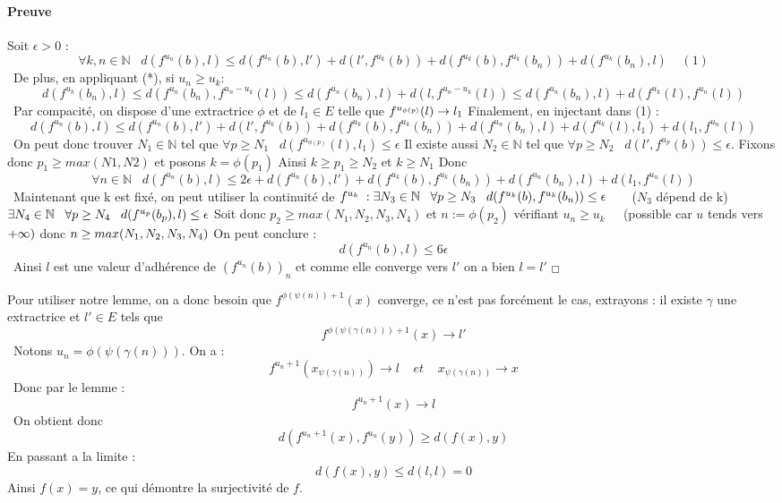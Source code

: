 \documentclass[letterpaper,10pt]{article}
\begin{document}
{\paragraph{Preuve}
Soit $\epsilon > 0$ : \[\ 
   \forall k,n\in \mathbb{N} \;\;\; d(f^{u_n}(b),l) \leq d(f^{u_n}(b),l') + d(l',f^{u_k}(b))  + d(f^{u_k}(b),f^{u_k}(b_n))+d(f^{u_k}(b_n),l) \;\;\;\;(1)\]\ De plus, en appliquant (*), si $u_n \geq u_k$:  
\[\  d(f^{u_k}(b_n),l) \leq d(f^{u_n}(b_n),f^{u_n-u_k}(l)) \leq d(f^{u_n}(b_n),l) + d(l,f^{u_n-u_k}(l))  \leq d(f^{u_n}(b_n),l) + d(f^{u_k}(l),f^{u_n}(l)) \]\
Par compacité, on dispose d'une extractrice $\phi$ et de $l_1 \in E$ telle que $f^{u_{\phi(p)}}(l)  \rightarrow l_1 \\ $
Finalement, en injectant dans (1) : \[\ d(f^{u_n}(b),l) \leq d(f^{u_n}(b),l') + d(l',f^{u_k}(b))  + d(f^{u_k}(b),f^{u_k}(b_n))+ d(f^{u_n}(b_n),l) + d(f^{u_k}(l),l_1) + d(l_1,f^{u_n}(l)) \]\
On peut donc  trouver $N_1 \in \mathbb{N} $ tel que $\forall p \geq N_1 \;\;\;d(f^{u_{\phi(p)}}(l),l_1) \leq \epsilon $ Il existe aussi $N_2 \in \mathbb{N} $ tel que $\forall p \geq N_2 \;\;\;d(l',f^{u_p}(b)) \leq \epsilon$. Fixons donc $ p_1 \geq max(N1,N2) $ et posons $ k = \phi(p_1) $ Ainsi $k \geq p_1 \geq N_2 $ et $k\geq N_1$ Donc \[\ \forall n \in \mathbb{N}\;\;\; d(f^{u_n}(b),l) \leq 2\epsilon + d(f^{u_n}(b),l')   + d(f^{u_k}(b),f^{u_k}(b_n))+ d(f^{u_n}(b_n),l) +  d(l_1,f^{u_n}(l)) \]\ Maintenant que k est fixé, on peut utiliser la continuité de $f^{u_k} \; : \;\\ \exists N_3 \in \mathbb{N} \;\;\; \forall p \geq N_3\;\;\; d(f^{u_k}(b),f^{u_k}(b_n)) \leq \epsilon \;\;\;\;\;\;  $ ($N_3$ dépend de k)$
\\ \exists N_4 \in \mathbb{N} \;\;\; \forall p \geq N_4\;\;\; d(f^{u_p}(b_p),l) \leq \epsilon \\ \\$ Soit donc $p_2 \geq max(N_1,N_2,N_3,N_4)$ et $n := \phi(p_2)  $ vérifiant $u_n \geq u_k \;\;\;\; $ (possible car $u$ tends vers $+\infty) \\ $ donc $ n \geq max(N_1,N_2,N_3,N_4) \\ $ On peut conclure : \[\  d(f^{u_n}(b),l) \leq 6\epsilon\]\ Ainsi $l$ est une valeur d'adhérence de $(f^{u_n}(b))_n$ et comme elle converge vers $l'$ on a bien $l=l'$ $_\Box \\ \\$

Pour utiliser notre lemme, on a donc besoin que $f^{\phi(\psi(n))+1}(x)$ converge,
 ce n'est pas forcément le cas, extrayons : il existe $ \gamma $ une extractrice
  et $l' \in E$ tels que \[\ f^{\phi(\psi(\gamma(n)))+1}(x) \rightarrow l' \]\ 
  Notons $u_n = \phi(\psi(\gamma(n)))$. On a : \[\ f^{u_n+1}(x_{\psi(\gamma(n))})
   \rightarrow l \;\;\;\; et \;\;\;\; x_{\psi(\gamma(n))} \rightarrow x\]\ Donc par
    le lemme : \[\ f^{u_n+1}(x) \rightarrow l \]\ On obtient donc
     \[\ d(f^{u_n + 1}(x),f^{u_n}(y)) \geq d(f(x),y) \] En passant 
     a la limite : \[\ d(f(x),y) \leq d(l,l) = 0 \] Ainsi $f(x) = y $, 
     ce qui démontre la surjectivité de $f$.  \[\ \]

}
\end{document}
